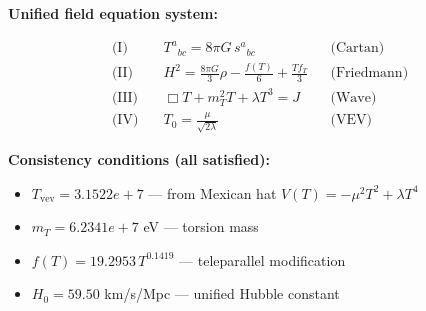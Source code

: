 
\textbf{Unified field equation system:}

\begin{align}
  \text{(I)} \quad & T^a{}_{bc} = 8\pi G \, s^a{}_{bc} && \text{(Cartan)} \\
  \text{(II)} \quad & H^2 = \frac{8\pi G}{3}\rho - \frac{f(T)}{6} + \frac{Tf_T}{3} && \text{(Friedmann)} \\
  \text{(III)} \quad & \Box T + m_T^2 T + \lambda T^3 = J && \text{(Wave)} \\
  \text{(IV)} \quad & T_0 = \frac{\mu}{\sqrt{2\lambda}} && \text{(VEV)}
\end{align}

\textbf{Consistency conditions (all satisfied):}
\begin{itemize}
  \item $T_{\text{vev}} = 3.1522e+7$ — from Mexican hat $V(T) = -\mu^2 T^2 + \lambda T^4$
  \item $m_T = 6.2341e+7$ eV — torsion mass
  \item $f(T) = 19.2953 \, T^{0.1419}$ — teleparallel modification
  \item $H_0 = 59.50$ km/s/Mpc — unified Hubble constant
\end{itemize}